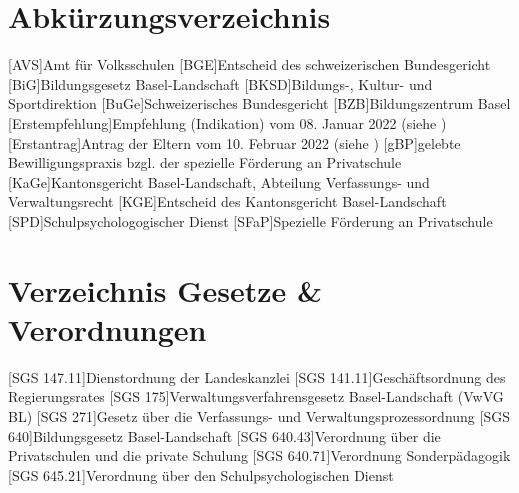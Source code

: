 \chapter{Abkürzungsverzeichnis}
\begin{acronym}
	[AVS]{Amt für Volksschulen}
	[BGE]{Entscheid des schweizerischen Bundesgericht}
	[BiG]{Bildungsgesetz Basel-Landschaft}
	[BKSD]{Bildungs-, Kultur- und Sportdirektion}
	[BuGe]{Schweizerisches Bundesgericht}
	[BZB]{Bildungszentrum Basel}
	[Erstempfehlung]{Empfehlung (Indikation) vom 08. Januar 2022 (siehe \cite{Erstindikation})}
	[Erstantrag]{Antrag der Eltern vom 10. Februar 2022 (siehe \cite{Elternantrag})}
	[gBP]{gelebte Bewilligungspraxis bzgl. der spezielle Förderung an Privatschule}
	[KaGe]{Kantonsgericht Basel-Landschaft, Abteilung Verfassungs- und Verwaltungsrecht}
	[KGE]{Entscheid des Kantonsgericht Basel-Landschaft}
	[SPD]{Schulpsychologogischer Dienst}
	[SFaP]{Spezielle Förderung an Privatschule}
\end{acronym}

\chapter{Verzeichnis Gesetze \& Verordnungen }
\begin{acronym}
	[SGS 147.11]{Dienstordnung der Landeskanzlei}
	[SGS 141.11]{Geschäftsordnung des Regierungsrates}
	[SGS 175]{Verwaltungsverfahrensgesetz Basel-Landschaft (VwVG BL)}
	[SGS 271]{Gesetz über die Verfassungs- und Verwaltungsprozessordnung}
	[SGS 640]{Bildungsgesetz Basel-Landschaft}
	[SGS 640.43]{Verordnung über die Privatschulen und die private Schulung}
	[SGS 640.71]{Verordnung Sonderpädagogik} 
	[SGS 645.21]{Verordnung über den Schulpsychologischen Dienst}
\end{acronym}
